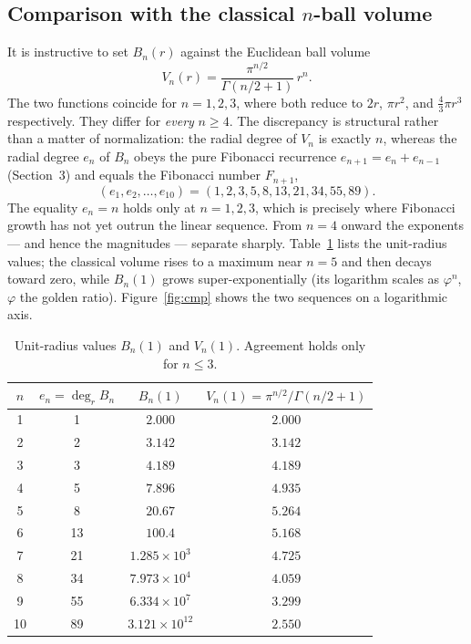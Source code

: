 \documentclass[11pt,a4paper]{article}
\theoremstyle{definition}
\begin{document}
\subsection{Comparison with the classical \texorpdfstring{$n$}{n}-ball volume}
\label{sec:comparison}

It is instructive to set \(B_n(r)\) against the Euclidean ball volume
\[
V_n(r) = \frac{\pi^{n/2}}{\Gamma(n/2+1)}\, r^n .
\]
The two functions coincide for \(n=1,2,3\), where both reduce to \(2r\), \(\pi r^2\), and \(\tfrac43\pi r^3\) respectively. They differ for \emph{every} \(n\geq 4\). The discrepancy is structural rather than a matter of normalization: the radial degree of \(V_n\) is exactly \(n\), whereas the radial degree \(e_n\) of \(B_n\) obeys the pure Fibonacci recurrence \(e_{n+1}=e_n+e_{n-1}\) (Section~3) and equals the Fibonacci number \(F_{n+1}\),
\[
(e_1,e_2,\dots,e_{10}) = (1,2,3,5,8,13,21,34,55,89).
\]
The equality \(e_n=n\) holds only at \(n=1,2,3\), which is precisely where Fibonacci growth has not yet outrun the linear sequence. From \(n=4\) onward the exponents — and hence the magnitudes — separate sharply. Table~\ref{tab:cmp} lists the unit-radius values; the classical volume rises to a maximum near \(n=5\) and then decays toward zero, while \(B_n(1)\) grows super-exponentially (its logarithm scales as \(\varphi^n\), \(\varphi\) the golden ratio). Figure~\ref{fig:cmp} shows the two sequences on a logarithmic axis.

\begin{table}[h]
\centering
\caption{Unit-radius values \(B_n(1)\) and \(V_n(1)\). Agreement holds only for \(n\le 3\).}
\label{tab:cmp}
\begin{tabular}{@{}cccc@{}}
\toprule
\(n\) & \(e_n=\deg_r B_n\) & \(B_n(1)\) & \(V_n(1)=\pi^{n/2}/\Gamma(n/2+1)\) \\
\midrule
1  & 1  & \(2.000\)              & \(2.000\) \\
2  & 2  & \(3.142\)              & \(3.142\) \\
3  & 3  & \(4.189\)              & \(4.189\) \\
4  & 5  & \(7.896\)              & \(4.935\) \\
5  & 8  & \(20.67\)              & \(5.264\) \\
6  & 13 & \(100.4\)              & \(5.168\) \\
7  & 21 & \(1.285\times10^{3}\)  & \(4.725\) \\
8  & 34 & \(7.973\times10^{4}\)  & \(4.059\) \\
9  & 55 & \(6.334\times10^{7}\)  & \(3.299\) \\
10 & 89 & \(3.121\times10^{12}\) & \(2.550\) \\
\bottomrule
\end{tabular}
\end{table}
\end{document}

